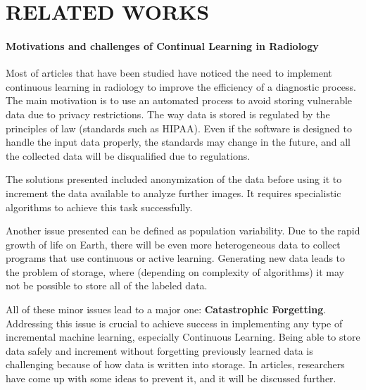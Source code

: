 \documentclass{IEEEcsmag}
\begin{document}
\section{RELATED WORKS}
    \paragraph{Motivations and challenges of Continual Learning in Radiology}
    Most of articles that have been studied have noticed the need to implement continuous learning in radiology to improve the efficiency of a diagnostic process.
    The main motivation is to use an automated process to avoid storing vulnerable data due to privacy restrictions\cite{cite-2}\cite{cite-18}\cite{cite-5}.
    The way data is stored is regulated by the principles of law (standards such as HIPAA)\cite{cite-2}\cite{cite-5}\cite{cite-18}.
    Even if the software is designed to handle the input data properly, the standards may change in the future, and all the collected data will be disqualified due to regulations. 
    
    The solutions presented included anonymization of the data before using it to increment the data available to analyze further images. It requires specialistic algorithms to achieve this task successfully.
    
    Another issue presented can be defined as population variability\cite{cite-20}\cite{cite-11}.
    Due to the rapid growth of life on Earth, there will be even more heterogeneous data to collect programs that use continuous or active learning\cite{cite-11}\cite{cite-20}.
    Generating new data leads to the problem of storage, where (depending on complexity of algorithms) it may not be possible to store all of the labeled data.

    All of these minor issues lead to a major one: \textbf{Catastrophic Forgetting}\cite{cite-18}\cite{cite-10}\cite{cite-1}\cite{cite-17}\cite{cite-19}.
    Addressing this issue is crucial to achieve success in implementing any type of incremental machine learning, especially Continuous Learning.
    Being able to store data safely and increment without forgetting previously learned data is challenging because of how data is written into storage. 
    In articles, researchers have come up with some ideas to prevent it, and it will be discussed further.
\end{document}
